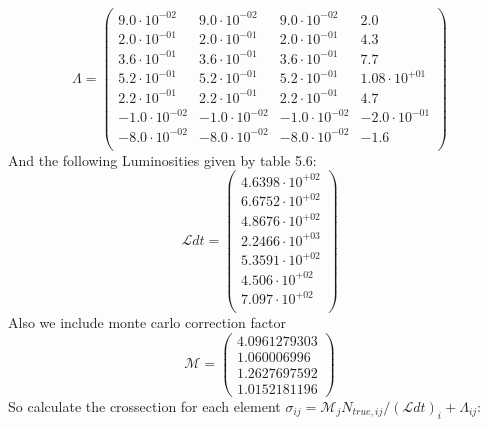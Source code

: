 \documentclass[]{article}
\begin{document}
\begin{equation}
\Lambda = \begin{pmatrix}
   9.0\cdot 10^{-02} & 9.0\cdot 10^{-02} & 9.0\cdot 10^{-02} & 2.0 \\
   2.0\cdot 10^{-01} & 2.0\cdot 10^{-01} & 2.0\cdot 10^{-01} & 4.3 \\
   3.6\cdot 10^{-01} & 3.6\cdot 10^{-01} & 3.6\cdot 10^{-01} & 7.7 \\
   5.2\cdot 10^{-01} & 5.2\cdot 10^{-01} & 5.2\cdot 10^{-01} & 1.08\cdot 10^{+01} \\
   2.2\cdot 10^{-01} & 2.2\cdot 10^{-01} & 2.2\cdot 10^{-01} & 4.7 \\
   -1.0\cdot 10^{-02} & -1.0\cdot 10^{-02} & -1.0\cdot 10^{-02} & -2.0\cdot 10^{-01} \\
   -8.0\cdot 10^{-02} & -8.0\cdot 10^{-02} & -8.0\cdot 10^{-02} & -1.6 \\
\end{pmatrix}
\end{equation}
And the following Luminosities given by table 5.6:
\begin{equation}
\mathcal{L}dt = \begin{pmatrix}
   4.6398\cdot 10^{+02} \\
   6.6752\cdot 10^{+02} \\
   4.8676\cdot 10^{+02} \\
   2.2466\cdot 10^{+03} \\
   5.3591\cdot 10^{+02} \\
   4.506\cdot 10^{+02} \\
   7.097\cdot 10^{+02} \\
\end{pmatrix}
\end{equation}
Also we include monte carlo correction factor
\begin{equation}
\mathcal{M} = \begin{pmatrix}
  4.0961279303 \\
  1.060006996 \\
  1.2627697592 \\
  1.0152181196
\end{pmatrix}
\end{equation}
So calculate the crossection for each element $\sigma_{ij} = \mathcal{M}_{j}N_{true,ij}/(\mathcal{L}dt)_i+\Lambda_{ij}$:
\end{document}

